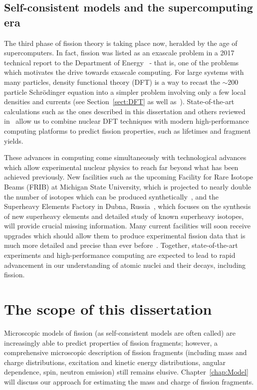 \subsection{Self-consistent models and the supercomputing era}
The third phase of fission theory is taking place now, heralded by the age of supercomputers. In fact, fission was listed as an exascale problem in a 2017 technical report to the Department of Energy~\cite{Carlson2017} - that is, one of the problems which motivates the drive towards exascale computing. For large systems with many particles, density functional theory (DFT) is a way to recast the ${\sim}$200 particle Schr\"{o}dinger equation into a simpler problem involving only a few local densities and currents (see Section~\ref{sect:DFT} as well as~\cite{bender2003}). State-of-the-art calculations such as the ones described in this dissertation and others reviewed in~\cite{schunck2016} allow us to combine nuclear DFT techniques with modern high-performance computing platforms to predict fission properties, such as lifetimes and fragment yields.%

These advances in computing come simultaneously with technological advances which allow experimental nuclear physics to reach far beyond what has been achieved previously. New facilities such as the upcoming Facility for Rare Isotope Beams (FRIB) at Michigan State University, which is projected to nearly double the number of isotopes which can be produced synthetically~\cite{Baumann2016}, and the Superheavy Elements Factory in Dubna, Russia~\cite{dmitriev2016}, which focuses on the synthesis of new superheavy elements and detailed study of known superheavy isotopes, will provide crucial missing information. Many current facilities will soon receive upgrades which should allow them to produce experimental fission data that is much more detailed and precise than ever before~\cite{Andreyev2018}. Together, state-of-the-art experiments and high-performance computing are expected to lead to rapid advancement in our understanding of atomic nuclei and their decays, including fission.

\section{The scope of this dissertation}
Microscopic models of fission (as self-consistent models are often called) are increasingly able to predict properties of fission fragments; however, a comprehensive microscopic description of fission fragments (including mass and charge distributions, excitation and kinetic energy distributions, angular dependence, spin, neutron emission) still remains elusive. Chapter~\ref{chap:Model} will discuss our approach for estimating the mass and charge of fission fragments.

